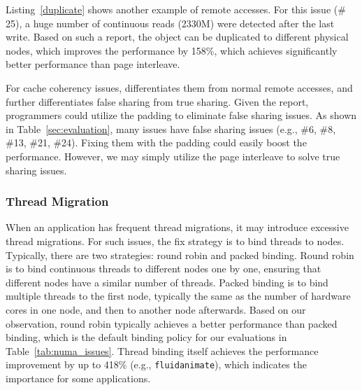 Listing~\ref{duplicate} shows another example of remote accesses. For this issue (\# 25), a huge number of continuous reads (2330M) were detected after the last write. Based on such a report, the object can be duplicated to different physical nodes, which improves the performance by 158\%, which achieves significantly better performance than page interleave. 

For cache coherency issues,  \NP{} differentiates them from normal remote accesses, and further differentiates false sharing from true sharing. Given the report, programmers could utilize the padding to eliminate false sharing issues. As shown in Table~\ref{sec:evaluation}, many issues have false sharing issues (e.g., \#6, \#8, \#13, \#21, \#24). Fixing them with the padding could easily boost the performance. However, we may simply utilize the page interleave to solve true sharing issues. 


\subsubsection{Thread Migration} 
When an application has frequent thread migrations, it may introduce excessive thread migrations. For such issues, the fix strategy is to bind threads to nodes. Typically, there are two strategies: round robin and packed binding. Round robin is to bind continuous threads to different nodes one by one,  ensuring that different nodes have a similar number of threads. Packed binding is to bind multiple threads to the first node, typically the same as the number of hardware cores in one node, and then to another node afterwards. Based on our observation, round robin typically achieves a better performance than packed binding, which is the default binding policy for our evaluations in Table~\ref{tab:numa_issues}. Thread binding itself achieves the performance improvement by up to 418\% (e.g., \texttt{fluidanimate}), which indicates the importance for some applications. 

